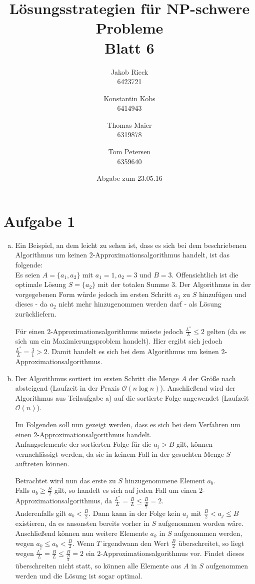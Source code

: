 \documentclass[12pt,a4paper]{article}
\title{Lösungsstrategien für NP-schwere Probleme\\Blatt 6}
\author{
		Jakob Rieck\\
		\small{6423721}
	\and
		Konstantin Kobs\\
		\small{6414943}
	\and
		Thomas Maier\\
		\small{6319878}
	\and
		Tom Petersen\\
		\small{6359640}
}
\date{Abgabe zum 23.05.16}
\begin{document}
\maketitle

\section*{Aufgabe 1}

 \begin{enumerate}[a)]

 	\item Ein Beispiel, an dem leicht zu sehen ist, dass es sich bei dem beschriebenen Algorithmus um keinen \(2\)-Approximationsalgorithmus handelt, ist das folgende:\\	
 	 Es seien \(A = \{a_1, a_2\}\) mit \(a_1 = 1, a_2 = 3\) und \(B = 3\). Offensichtlich ist die optimale Lösung \(S = \{a_2\}\) mit der totalen Summe \(3\). Der Algorithmus in der vorgegebenen Form würde jedoch im ersten Schritt \(a_1\) zu \(S\) hinzufügen und dieses - da \(a_2\) nicht mehr hinzugenommen werden darf - als Lösung zurückliefern. 
 	 
 	 Für einen \(2\)-Approximationsalgorithmus müsste jedoch \(\frac{L^*}{L} \le 2\) gelten (da es sich um ein Maximierungsproblem handelt). Hier ergibt sich jedoch \(\frac{L^*}{L} = \frac{3}{1} > 2\). Damit handelt es sich bei dem Algorithmus um keinen \(2\)-Approximationsalgorithmus.
 	
 	\item Der Algorithmus sortiert im ersten Schritt die Menge \(A\) der Größe nach absteigend (Laufzeit in der Praxis \(\mathcal{O}(n \log n)\)). Anschließend wird der Algorithmus aus Teilaufgabe a) auf die sortierte Folge angewendet (Laufzeit \(\mathcal{O}(n)\)).
 	
 	Im Folgenden soll nun gezeigt werden, dass es sich bei dem Verfahren um einen \(2\)-Approximationsalgorithmus handelt.\\
 	Anfangselemente der sortierten Folge für die \(a_i > B\) gilt, können vernachlässigt werden, da sie in keinem Fall in der gesuchten Menge \(S\) auftreten können. 
 	
 	Betrachtet wird nun das erste zu \(S\) hinzugenommene Element \(a_b\).\\
 	Falls \(a_b \ge \frac{B}{2}\) gilt, so handelt es sich auf jeden Fall um einen \(2\)-Appro\-xi\-ma\-tions\-algorithmus, da \(\frac{L^*}{L} = \frac{B}{L} \le \frac{B}{\frac{B}{2}} = 2\).\\
 	Anderenfalls gilt \(a_b < \frac{B}{2}\). Dann kann in der Folge kein \(a_j\) mit \(\frac{B}{2} < a_j \le B\) existieren, da es ansonsten bereits vorher in \(S\) aufgenommen worden wäre. Anschließend können nun weitere Elemente \(a_k\) in \(S\) aufgenommen werden, wegen \(a_k \le a_b < \frac{B}{2}\). Wenn \(T\) irgendwann den Wert \(\frac{B}{2}\) überschreitet, so liegt wegen \(\frac{L^*}{L} = \frac{B}{L} \le \frac{B}{\frac{B}{2}} = 2\) ein \(2\)-Appro\-xi\-ma\-tions\-algorithmus vor. Findet dieses überschreiten nicht statt, so können alle Elemente aus \(A\) in \(S\) aufgenommen werden und die Lösung ist sogar optimal. 
 	

\end{enumerate}
\end{document}
